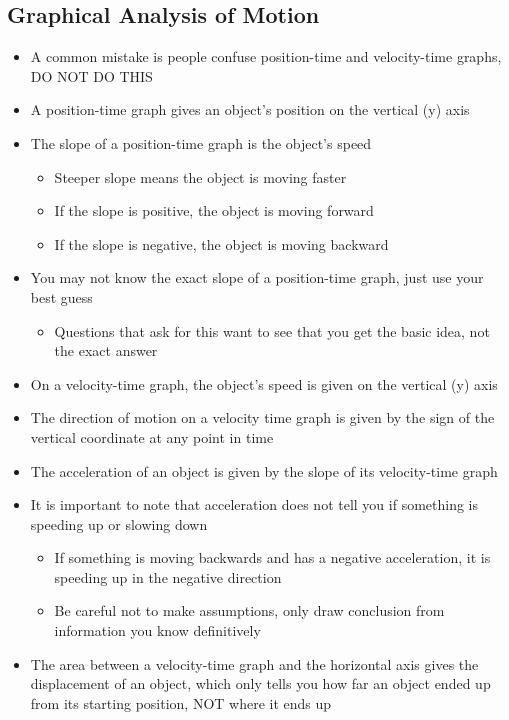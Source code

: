 \subsection{Graphical Analysis of Motion}
\begin{itemize}
    \item A common mistake is people confuse position-time and velocity-time graphs, DO NOT DO THIS
    \item A position-time graph gives an object's position on the vertical (y) axis
    \item The slope of a position-time graph is the object's speed
    \begin{itemize}
        \item Steeper slope means the object is moving faster
        \item If the slope is positive, the object is moving forward
        \item If the slope is negative, the object is moving backward
    \end{itemize}
    \item You may not know the exact slope of a position-time graph, just use your best guess
    \begin{itemize}
        \item Questions that ask for this want to see that you get the basic idea, not the exact answer
    \end{itemize}
    \item On a velocity-time graph, the object's speed is given on the vertical (y) axis
    \item The direction of motion on a velocity time graph is given by the sign of the vertical coordinate at any point in time
    \item The acceleration of an object is given by the slope of its velocity-time graph
    \item It is important to note that acceleration does not tell you if something is speeding up or slowing down
    \begin{itemize}
        \item If something is moving backwards and has a negative acceleration, it is speeding up in the negative direction
        \item Be careful not to make assumptions, only draw conclusion from information you know definitively
    \end{itemize}
    \item The area between a velocity-time graph and the horizontal axis gives the displacement of an object, which only tells you how far an object ended up from its starting position, NOT where it ends up
\end{itemize}

